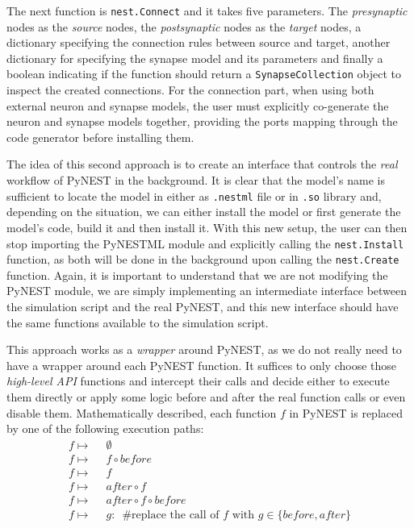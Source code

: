 The next function is \texttt{nest.Connect} and it takes five parameters. The \emph{presynaptic} nodes as the \emph{source} nodes, the \emph{postsynaptic} nodes as the \emph{target} nodes, a dictionary specifying the connection rules between source and target, another dictionary for specifying the synapse model and its parameters and finally a boolean indicating if the function should return a \texttt{SynapseCollection} object to inspect the created connections. For the connection part, when using both external neuron and synapse models, the user must explicitly co-generate the neuron and synapse models together, providing the ports mapping through the code generator before installing them.

The idea of this second approach is to create an interface that controls the \emph{real} workflow of PyNEST in the background. It is clear that the model's name is sufficient to locate the model in either as \texttt{.nestml} file or in \texttt{.so} library and, depending on the situation, we can either install the model or first generate the model's code, build it and then install it. With this new setup, the user can then stop importing the PyNESTML module and explicitly calling the \texttt{nest.Install} function, as both will be done in the background upon calling the \texttt{nest.Create} function. Again, it is important to understand that we are not modifying the PyNEST module, we are simply implementing an intermediate interface between the simulation script and the real PyNEST, and this new interface should have the same functions available to the simulation script.



This approach works as a \emph{wrapper} around PyNEST, as we do not really need to have a wrapper around each PyNEST function. It suffices to only choose those \emph{high-level API} functions and intercept their calls and decide either to execute them directly or apply some logic before and after the real function calls or even disable them.  Mathematically described, each function $f$ in PyNEST is replaced by one of the following execution paths:
\begin{align*} 
f \mapsto&\enspace\emptyset\\
f \mapsto&\enspace f \circ before \\
f \mapsto&\enspace f \\
f \mapsto&\enspace after \circ f \\
f \mapsto&\enspace after \circ f \circ before\\
f \mapsto&\enspace g:\enspace \text{\#replace the call of } f \text{ with } g \in \{before, after\}  \\
\end{align*}


